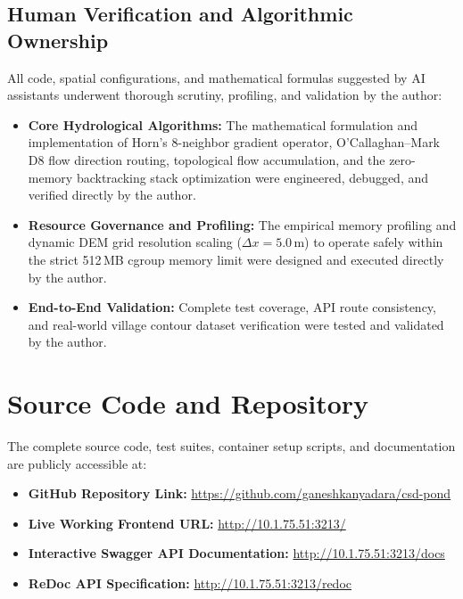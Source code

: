 \documentclass[manuscript,screen,review]{acmart}
\begin{document}
\subsection{Human Verification and Algorithmic Ownership}
All code, spatial configurations, and mathematical formulas suggested by AI assistants underwent thorough scrutiny, profiling, and validation by the author:
\begin{itemize}
    \item \textbf{Core Hydrological Algorithms:} The mathematical formulation and implementation of Horn's 8-neighbor gradient operator, O'Callaghan--Mark D8 flow direction routing, topological flow accumulation, and the zero-memory backtracking stack optimization were engineered, debugged, and verified directly by the author.
    \item \textbf{Resource Governance and Profiling:} The empirical memory profiling and dynamic DEM grid resolution scaling ($\Delta x = 5.0$\,m) to operate safely within the strict 512\,MB cgroup memory limit were designed and executed directly by the author.
    \item \textbf{End-to-End Validation:} Complete test coverage, API route consistency, and real-world village contour dataset verification were tested and validated by the author.
\end{itemize}

\appendix

\section{Source Code and Repository}
\label{sec:repo}

The complete source code, test suites, container setup scripts, and documentation are publicly accessible at:
\begin{itemize}
    \item \textbf{GitHub Repository Link:} \url{https://github.com/ganeshkanyadara/csd-pond}
    \item \textbf{Live Working Frontend URL:} \url{http://10.1.75.51:3213/}
    \item \textbf{Interactive Swagger API Documentation:} \url{http://10.1.75.51:3213/docs}
    \item \textbf{ReDoc API Specification:} \url{http://10.1.75.51:3213/redoc}
\end{itemize}
\end{document}
